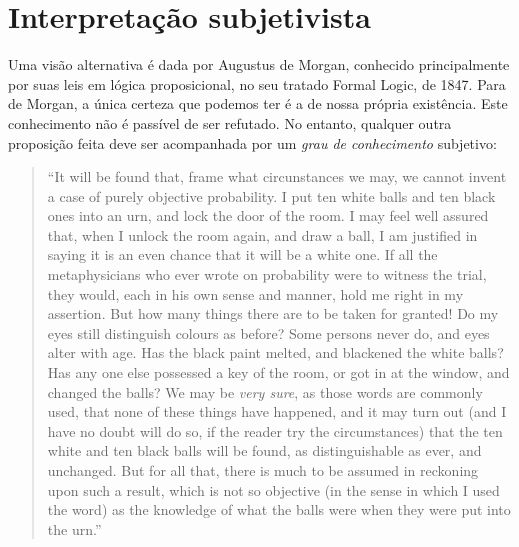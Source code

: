 \section{Interpretação subjetivista}
Uma visão alternativa é dada por Augustus de Morgan, conhecido principalmente por suas leis em lógica proposicional, 
no seu tratado Formal Logic, de 1847. Para de Morgan, a única certeza que podemos ter é a de nossa própria existência. 
Este conhecimento
não é passível de ser refutado. No entanto, qualquer outra proposição feita deve ser acompanhada por 
um {\em grau de conhecimento} subjetivo:

\begin{quote}
``It will be found that, frame what circunstances we may, we cannot invent a case of purely objective probability.
I put ten white balls and ten black ones into an urn, and lock the door of the room. I may feel well assured that,
when I unlock the room again, and draw a ball, I am justified in saying it is an even chance that it will be a white one.
If all the metaphysicians who ever wrote on probability were to witness the trial, they would, each in his own sense and 
manner, hold me right in my assertion. But how many things there are to be taken for granted! Do my eyes still distinguish
colours as before? Some persons never do, and eyes alter with age. Has the black paint melted, and blackened the white balls?
Has any one else possessed a key of the room, or got in at the window, and changed the balls? We may be {\em very sure},
as those words are commonly used, that none of these things have happened, and it may turn out (and I have no doubt will do so,
if the reader try the circumstances) that the ten white and ten black balls will be found, as distinguishable as ever, and
unchanged. But for all that, there is much to be assumed in reckoning upon such a result, which is not so objective (in the
sense in which I used the word) as the knowledge of what the balls were when they were put into the urn.'' \citep{deMorgan1847}
\end{quote}

